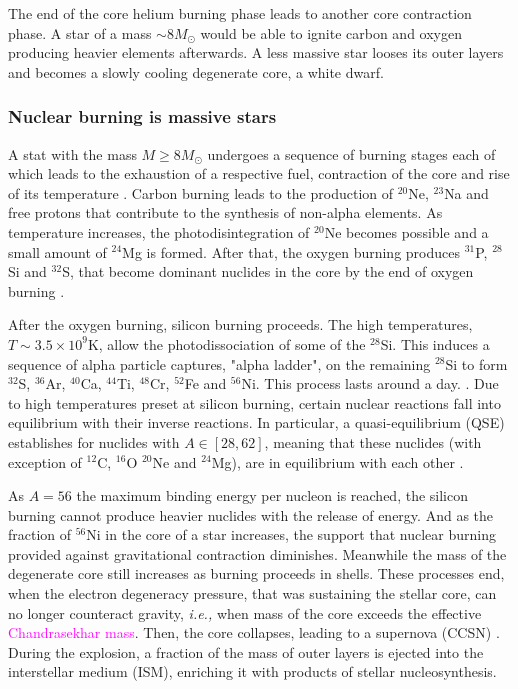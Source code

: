 \documentclass[11pt,a4paper,headinclude=true,DIV=14,BCOR=8mm,chapterprefix,listof=totoc,twoside,openright,abstracton]{scrbook}
\newcommand{\magenta}[1]{\textcolor{magenta}{#1}} %
\begin{document}
The end of the core helium burning phase leads to another core contraction phase. A star of a mass $\sim 8M_{\odot}$ would be able to ignite carbon and oxygen producing heavier elements afterwards. A less massive star looses its outer layers and becomes a slowly cooling degenerate core, a white dwarf.


\subsubsection{Nuclear burning is massive stars}

A stat with the mass $M\geq 8M_{\odot}$ undergoes a sequence of burning stages  each of which leads to the exhaustion of a respective fuel, contraction of the core and rise of its temperature \cite{Woosley:2002}. 
Carbon burning leads to the production of $^{20}$Ne, $^{23}$Na and free protons that contribute to the synthesis of non-alpha elements. 
As temperature increases, the photodisintegration of $^{20}$Ne becomes possible and a small amount of $^{24}$Mg is formed. 
After that, the oxygen burning produces $^{31}$P, $^{28}$Si and $^{32}$S, that become dominant nuclides in the core by the end of oxygen burning \cite{Rolfs:1988}.

After the oxygen burning, silicon burning proceeds. The high temperatures, $T\sim3.5\times10^9$K, allow the photodissociation of some of the $^{28}$Si. This induces a sequence of alpha particle captures, "alpha ladder", on the remaining $^{28}$Si to form $^{32}$S, $^{36}$Ar, $^{40}$Ca, $^{44}$Ti, $^{48}$Cr, $^{52}$Fe and $^{56}$Ni. This process lasts around a day. \cite{Rolfs:1988,Hasen:2004}. 
Due to high temperatures preset at silicon burning, certain nuclear reactions fall into equilibrium with their inverse reactions. In particular, a quasi-equilibrium (QSE) establishes for nuclides with $A\in[28, 62]$, meaning that these nuclides (with exception of $^{12}$C, $^{16}$O $^{20}$Ne and $^{24}$Mg), are in equilibrium with each other \cite{Woosley:1973}. 

As $A=56$ the maximum binding energy per nucleon is reached, the silicon burning cannot produce heavier nuclides with the release of energy. And as the fraction of $^{56}$Ni in the core of a star increases, the support that nuclear burning provided against gravitational contraction diminishes. Meanwhile the mass of the degenerate core still increases as burning proceeds in shells.
These processes end, when the electron degeneracy pressure, that was sustaining the stellar core, can no longer counteract gravity, \textit{i.e.,} when mass of the core exceeds the effective \magenta{Chandrasekhar mass}.
Then, the core collapses, leading to a supernova (CCSN) \cite{Woosley:2002}.
During the explosion, a fraction of the mass of outer layers is ejected into the interstellar medium (ISM), enriching it with products of stellar nucleosynthesis. 
\end{document}
